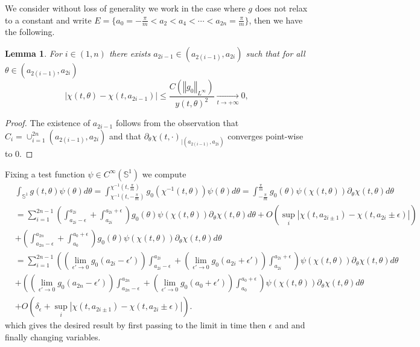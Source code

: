 \documentclass[10pt]{article}
\numberwithin{equation}{section}
\theoremstyle{plain}
\newtheorem{lemma}{Lemma}[section]
\theoremstyle{definition}
\newcommand{\prt}[1]{\left( #1 \right)}
\newcommand{\norm}[1]{\left\Vert #1 \right\Vert}
\newcommand{\abs}[1]{\left| #1 \right|}
\numberwithin{equation}{section}
\begin{document}
We consider without loss of generality we work in the case where $g$ does not relax to a constant and write $E=\{a_{0}=-\frac{\pi}{m}<a_2<a_4<\cdots<a_{2n}=\frac{\pi}{m}\}$, then we have the following.
\begin{lemma}\label{lem:prf rlx jump}
For $i\in (1,n)$ there exists $a_{2i-1}\in (a_{2(i-1)},a_{2i})$ such that for all $\theta \in (a_{2(i-1)},a_{2i})$ 
\[
\abs{\chi(t,\theta)-\chi(t,a_{2i-1})}\leq \frac{C(\norm{g_0}_{L^\infty})}{y(t,\theta)^2}\underset{t\rightarrow+\infty}{\longrightarrow}0,
\]
\end{lemma}
\begin{proof}
The existence of $a_{2i-1}$ follows from the observation that $C_i=\cup_{i=1}^{2n}(a_{2(i-1)},a_{2i})$ and that $\partial_{\theta}\chi(t,\cdot)_{|(a_{2(i-1)},a_{2i})}$ converges point-wise to $0$.
\end{proof}
Fixing a test function $\psi\in C^\infty(\mathbb{S}^1)$ we compute
\begin{align*}
    &\int_{\mathbb{S}^1}g(t,\theta)\psi(\theta)d\theta=\int^{\chi^{-1}(t,\frac{\pi}{m})}_{\chi^{-1}(t,-\frac{\pi}{m})}g_0(\chi^{-1}(t,\theta))\psi(\theta)d\theta=\int^{\frac{\pi}{m}}_{-\frac{\pi}{m}}g_0(\theta)\psi(\chi(t,\theta))\partial_{\theta}\chi(t,\theta)d\theta\\
    &=\sum^{2n-1}_{i=1}\prt{\int^{a_{2i}}_{a_{2i}-\epsilon}+\int^{a_{2i}+\epsilon}_{a_{2i}}}g_0(\theta)\psi(\chi(t,\theta))\partial_{\theta}\chi(t,\theta)d\theta+O\prt{\sup_i \abs{\chi(t,a_{2i\pm1})-\chi(t,a_{2i}\pm\epsilon)}}\\
   &+\prt{\int^{a_{2n}}_{a_{2n}-\epsilon}+\int^{a_{0}+\epsilon}_{a_{0}}}g_0(\theta)\psi(\chi(t,\theta))\partial_{\theta}\chi(t,\theta)d\theta\\
     &=\sum^{2n-1}_{i=1}\prt{\prt{\lim_{\epsilon'\rightarrow 0}g_0(a_{2i}-\epsilon')}\int^{a_{2i}}_{a_{2i}-\epsilon}+\prt{\lim_{\epsilon'\rightarrow 0}g_0(a_{2i}+\epsilon')}\int^{a_{2i}+\epsilon}_{a_{2i}}}\psi(\chi(t,\theta))\partial_{\theta}\chi(t,\theta)d\theta\\
    &+\prt{\prt{\lim_{\epsilon'\rightarrow 0}g_0(a_{2n}-\epsilon')}\int^{a_{2n}}_{a_{2n}-\epsilon}+\prt{\lim_{\epsilon'\rightarrow 0}g_0(a_{0}+\epsilon')}\int^{a_{0}+\epsilon}_{a_{0}}}\psi(\chi(t,\theta))\partial_{\theta}\chi(t,\theta)d\theta\\
    &+O\prt{\delta_\epsilon+\sup_i \abs{\chi(t,a_{2i\pm1})-\chi(t,a_{2i}\pm\epsilon)}}.
\end{align*}
which gives the desired result by first passing to the limit in time then $\epsilon$ and and finally changing variables.
\end{document}
